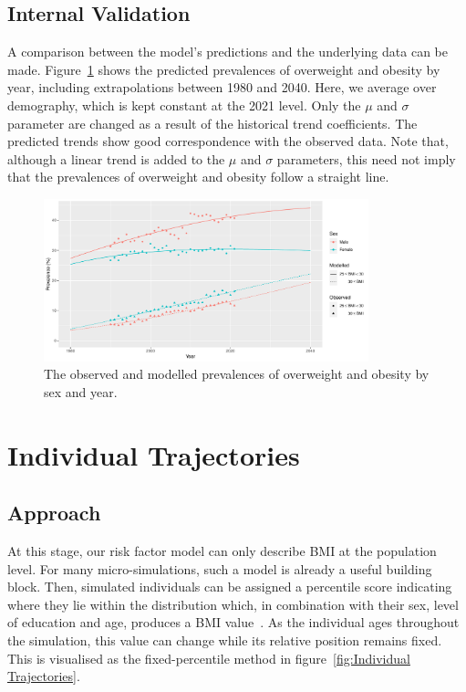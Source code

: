 \documentclass{imammb}
\numberwithin{equation}{section}
\begin{document}
\subsection{Internal Validation}
\label{sec:Historical Trend/Internal Validation}

A comparison between the model's predictions and the underlying data can be made. Figure~\ref{fig:Historical Trend} shows the predicted prevalences of overweight and obesity by year, including extrapolations between 1980 and 2040. Here, we average over demography, which is kept constant at the 2021 level. Only the $\mu$ and $\sigma$ parameter are changed as a result of the historical trend coefficients. The predicted trends show good correspondence with the observed data. Note that, although a linear trend is added to the $\mu$ and $\sigma$ parameters, this need not imply that the prevalences of overweight and obesity follow a straight line.

\begin{figure}[!h]
\centering
\includegraphics[width=0.84\textwidth] {"Figures/Historical Trend.pdf"}
\caption{The observed and modelled prevalences of overweight and obesity by sex and year.}
\label{fig:Historical Trend}
\vspace*{-9pt}
\end{figure}

\section{Individual Trajectories}
\label{sec:Individual Trajectories}

\subsection{Approach}
\label{sec:Individual Trajectories/Approach}

At this stage, our risk factor model can only describe BMI at the population level. For many micro-simulations, such a model is already a useful building block. Then, simulated individuals can be assigned a percentile score indicating where they lie within the distribution which, in combination with their sex, level of education and age, produces a BMI value~\citep{McPherson2007, OECD2019}. As the individual ages throughout the simulation, this value can change while its relative position remains fixed. This is visualised as the fixed-percentile method in figure~\ref{fig:Individual Trajectories}.
\end{document}
